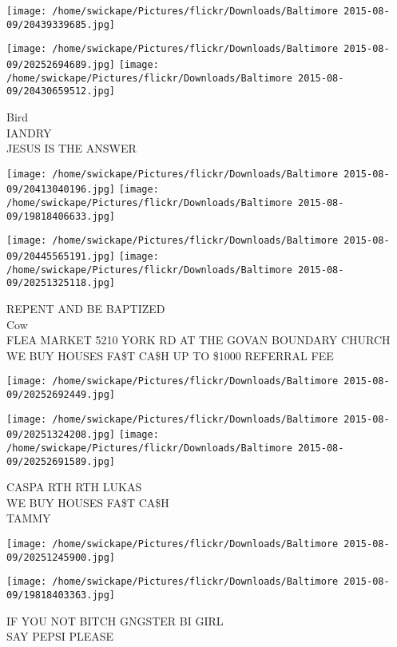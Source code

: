 \documentclass[10pt,letterpaper]{article}
\begin{document}
\texttt{[image: /home/swickape/Pictures/flickr/Downloads/Baltimore 2015-08-09/20439339685.jpg]}

\vspace{0.25in}
\texttt{[image: /home/swickape/Pictures/flickr/Downloads/Baltimore 2015-08-09/20252694689.jpg]}
\texttt{[image: /home/swickape/Pictures/flickr/Downloads/Baltimore 2015-08-09/20430659512.jpg]}

Bird\\
IANDRY\\
JESUS IS THE ANSWER
\pagebreak

\texttt{[image: /home/swickape/Pictures/flickr/Downloads/Baltimore 2015-08-09/20413040196.jpg]}
\texttt{[image: /home/swickape/Pictures/flickr/Downloads/Baltimore 2015-08-09/19818406633.jpg]}

\texttt{[image: /home/swickape/Pictures/flickr/Downloads/Baltimore 2015-08-09/20445565191.jpg]}
\texttt{[image: /home/swickape/Pictures/flickr/Downloads/Baltimore 2015-08-09/20251325118.jpg]}

REPENT AND BE BAPTIZED\\
Cow\\
FLEA MARKET 5210 YORK RD AT THE GOVAN BOUNDARY CHURCH\\
WE BUY HOUSES FA\$T CA\$H UP TO \$1000 REFERRAL FEE
\pagebreak

\texttt{[image: /home/swickape/Pictures/flickr/Downloads/Baltimore 2015-08-09/20252692449.jpg]}

\vspace{0.25in}
\texttt{[image: /home/swickape/Pictures/flickr/Downloads/Baltimore 2015-08-09/20251324208.jpg]}
\texttt{[image: /home/swickape/Pictures/flickr/Downloads/Baltimore 2015-08-09/20252691589.jpg]}

CASPA RTH RTH LUKAS\\
WE BUY HOUSES FA\$T CA\$H\\
TAMMY
\pagebreak

\texttt{[image: /home/swickape/Pictures/flickr/Downloads/Baltimore 2015-08-09/20251245900.jpg]}

\vspace{0.25in}
\texttt{[image: /home/swickape/Pictures/flickr/Downloads/Baltimore 2015-08-09/19818403363.jpg]}

IF YOU NOT BITCH GNGSTER BI GIRL\\
SAY PEPSI PLEASE
\pagebreak
\end{document}
